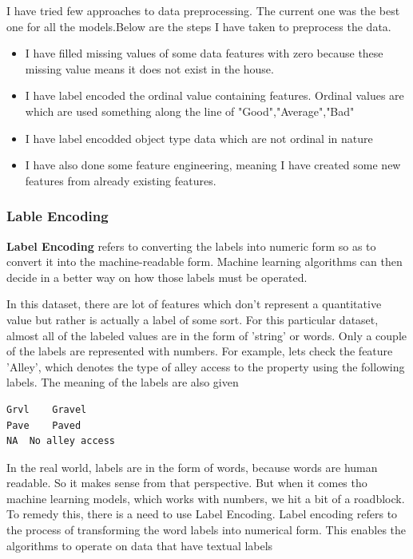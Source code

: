 \documentclass[11pt, a4paper , landscape]{article}
\begin{document}
I have tried few approaches to data preprocessing. The current one was
the best one for all the models.Below are the steps I have taken to
preprocess the data.

\begin{itemize}
\item
  I have filled missing values of some data features with zero because
  these missing value means it does not exist in the house.
\item
  I have label encoded the ordinal value containing features. Ordinal
  values are which are used something along the line of
  "Good","Average","Bad"
\item
  I have label encodded object type data which are not ordinal in nature
\item
  I have also done some feature engineering, meaning I have created some
  new features from already existing features.
\end{itemize}

\subsubsection{Lable Encoding}\label{lable-encoding}

\textbf{Label Encoding} refers to converting the labels into numeric
form so as to convert it into the machine-readable form. Machine
learning algorithms can then decide in a better way on how those labels
must be operated.

In this dataset, there are lot of features which don't represent a
quantitative value but rather is actually a label of some sort. For this
particular dataset, almost all of the labeled values are in the form of
'string' or words. Only a couple of the labels are represented with
numbers. For example, lets check the feature 'Alley', which denotes the
type of alley access to the property using the following labels. The
meaning of the labels are also given

\begin{verbatim}
Grvl    Gravel
Pave    Paved
NA  No alley access
\end{verbatim}

In the real world, labels are in the form of words, because words are
human readable. So it makes sense from that perspective. But when it
comes tho machine learning models, which works with numbers, we hit a
bit of a roadblock. To remedy this, there is a need to use Label
Encoding. Label encoding refers to the process of transforming the word
labels into numerical form. This enables the algorithms to operate on
data that have textual labels
\end{document}
